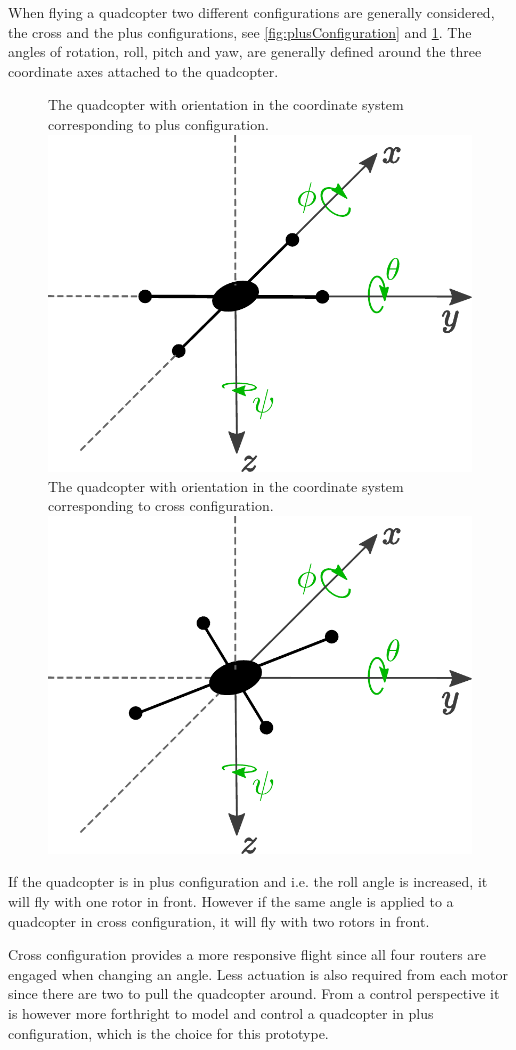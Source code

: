 When flying a quadcopter two different configurations are generally considered, the cross and the plus configurations, see \autoref{fig:plusConfiguration} and \ref{fig:crossConfiguration}. The angles of rotation, roll, pitch and yaw, are generally defined around the three coordinate axes attached to the quadcopter. \cite{HLChan}
%
\begin{figure}[H]
  \centering
  \captionbox
  {
    The quadcopter with orientation in the coordinate system corresponding to plus configuration.
    \label{fig:plusConfiguration}
  }
  {
    \includegraphics[width=.44\textwidth]{figures/plusConfiguration}
  }
  \hspace{5pt}
  \captionbox
  {
    The quadcopter with orientation in the coordinate system corresponding to cross configuration.
    \label{fig:crossConfiguration}
  }
  {
    \includegraphics[width=.44\textwidth]{figures/crossConfiguration}
  }
\end{figure}
%
If the quadcopter is in plus configuration and i.e. the roll angle is increased, it will fly with one rotor in front. However if the same angle is applied to a quadcopter in cross configuration, it will fly with two rotors in front. \cite{HLChan}

Cross configuration provides a more responsive flight since all four routers are engaged when changing an angle. Less actuation is also required from each motor since there are two to pull the quadcopter around. From a control perspective it is however more forthright to model and control a quadcopter in plus configuration, which is the choice for this prototype. \cite{HLChan}

